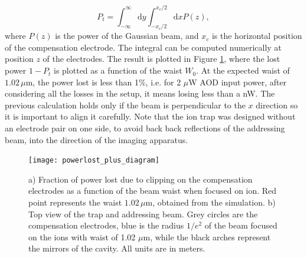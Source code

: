 \begin{equation}
P_{t} = \int_{-\infty}^{\infty}\text{d}y \int_{-x_c/2}^{x_c/2}\text{d}x P(z),
\end{equation}
where $P(z)$ is the power of the Gaussian beam, and $x_c$ is the horizontal position of the compensation electrode. The integral can be computed numerically at position $z$ of the electrodes. The result is plotted in Figure \ref{lossesplot}, where the lost power $1-P_{t}$ is plotted as a function of the waist $W_0$. At the expected waist of $1.02\,\mu$m, the power lost is less than 1\%, i.e. for 2 $\mu$W AOD input power, after considering all the losses in the setup, it means losing less than a nW. The previous calculation holds only if the beam is perpendicular to the $x$ direction so it is important to align it carefully. Note that the ion trap was designed without an electrode pair on one side, to avoid back back reflections of the addressing beam, into the direction of the imaging apparatus.
\begin{figure}
       \centering
         \texttt{[image: powerlost\_plus\_diagram]}
         \caption{a) Fraction of power lost due to clipping on the compensation electrodes as a function of the beam waist when focused on ion. Red point represents the waist $1.02\,\mu$m, obtained from the simulation. b) Top view of the trap and addressing beam. Grey circles are the compensation electrodes, blue is the radius $1/e^2$ of the beam focused on the ions with waist of 1.02 $\mu$m, while the black arches represent the mirrors of the cavity. All units are in meters.}
         \label{lossesplot}
 \end{figure}

